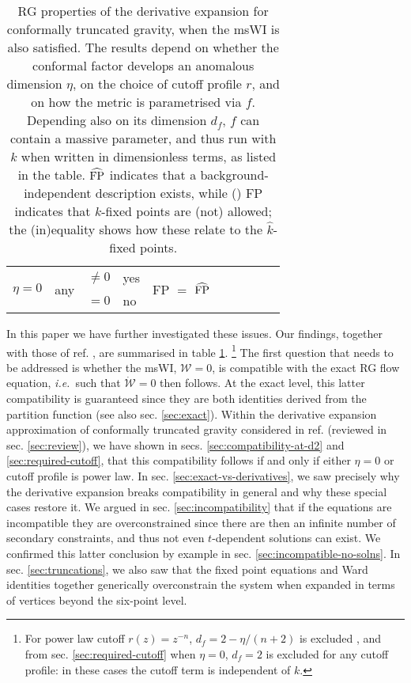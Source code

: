 \documentclass[11pt,draft]{book} %
\newcommand\ie{\textit{i.e.}\ }
\newcommand{\hk}{\hat k}
\begin{document}
\begin{table}[]
\begin{center}
\begin{tabular}{ r@{\hskip 10mm}  l  r  l@{\hskip 10mm}  c  c  c  c  c  c  c }
      \multirow{2}{*}{$\eta =0$}    & \multirow{2}{*}{any} & $\ne0$          & yes                      & \multicolumn{2}{c}{\multirow{2}{*}{FP $=$ $\widehat{\rm FP}$}}                                   \\[0.5mm]
                                    &                      & $=0$            & no                       & \multicolumn{2}{c}{}                                                                             \\
      \bottomrule
    \end{tabular}
  \end{center}
  \caption{
    RG properties of the derivative expansion for conformally truncated gravity,
    when the msWI is also satisfied.
    The results depend on whether the conformal factor develops an anomalous dimension $\eta$,
    on the choice of cutoff profile $r$, and on how the metric is parametrised via $f$.
    Depending also on its dimension $d_f$, $f$ can contain a massive parameter,
    and thus run with $k$ when written in dimensionless terms, as listed in the table.
    $\widehat{\rm FP}$ indicates that a background-independent description exists,
    while () FP  indicates that $k$-fixed points are (not) allowed;
    the (in)equality shows how these relate to the $\hk$-fixed points.
  }
  \label{table:summary}
\end{table}

In this paper we have further investigated these issues.
Our findings, together with those of ref. \cite{Dietz:2015owa}, are summarised in table \ref{table:summary}.
\footnote{For power law cutoff  $r(z)=z^{-n}$, $d_f = 2-\eta/(n+2)$ is excluded \cite{Dietz:2015owa},
and from sec. \ref{sec:required-cutoff} when $\eta=0$,  $d_f=2$ is excluded for any cutoff profile:
in these cases the cutoff term is independent of $k$.}
The first question that needs to be addressed is whether the msWI,
$\mathcal{W}=0$, is compatible with the exact RG flow equation, \ie such that $\dot{\mathcal{W}}=0$ then follows.
At the exact level, this latter compatibility is guaranteed since they are both identities derived from the
partition function (see also sec. \ref{sec:exact}).
Within the derivative expansion approximation of conformally truncated gravity considered in ref.
\cite{Dietz:2015owa} (reviewed in sec. \ref{sec:review}),
we have shown  in secs. \ref{sec:compatibility-at-d2} and \ref{sec:required-cutoff},
that this compatibility follows if and only if either $\eta=0$ or cutoff profile is power law.
In sec. \ref{sec:exact-vs-derivatives}, we saw precisely why the derivative expansion breaks compatibility
in general and why these special cases restore it.
We argued in sec. \ref{sec:incompatibility} that if the equations are incompatible they are overconstrained
since there are then an infinite number of secondary constraints,
and thus not even $t$-dependent solutions can exist.
We confirmed this latter conclusion by example in sec. \ref{sec:incompatible-no-solns}.
In sec. \ref{sec:truncations},
we also saw that the fixed point equations and Ward identities together generically overconstrain the
system when expanded in terms of vertices beyond the six-point level.
\end{document}
